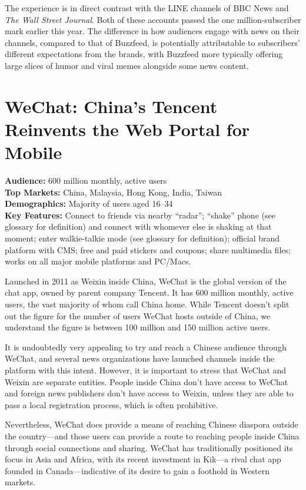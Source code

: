 \documentclass[notoc, symmetric, nobib, nols]{towcenter-guideto-book}
\begin{document}
The experience is in direct contrast with the LINE channels of BBC News and \textit{The Wall Street Journal}. Both of these accounts passed the one million-subscriber mark earlier this year. The difference in how audiences engage with news on their channels, compared to that of Buzzfeed, is potentially attributable to subscribers' different expectations from the brands, with Buzzfeed more typically offering large slices of humor and viral memes alongside some news content.

\section{WeChat: China's Tencent Reinvents the Web Portal for Mobile}

\begin{framed}
\noindent\textbf{Audience:} 600 million monthly, active users\\
\noindent\textbf{Top Markets:} China, Malaysia, Hong Kong, India, Taiwan\\
\noindent\textbf{Demographics:} Majority of users aged 16--34\\
\noindent\textbf{Key Features:} Connect to friends via nearby ``radar''; ``shake'' phone (see glossary for definition) and connect with whomever else is shaking at that moment; enter walkie-talkie mode (see glossary for definition); official brand platform with CMS; free and paid stickers and coupons; share multimedia files; works on all major mobile platforms and PC/Macs.
\end{framed}
\vspace{\baselineskip}
Launched in 2011 as Weixin inside China, WeChat is the global version of the chat app, owned by parent company Tencent. It has 600 million monthly, active users,\autocite{TencentResults} the vast majority of whom call China home. While Tencent doesn't split out the figure for the number of users WeChat hosts outside of China, we understand the figure is between 100 million and 150 million active users.

It is undoubtedly very appealing to try and reach a Chinese audience through WeChat, and several news organizations have launched channels inside the platform with this intent. However, it is important to stress that WeChat and Weixin are separate entities. People inside China don't have access to WeChat and foreign news publishers don't have access to Weixin, unless they are able to pass a local registration process, which is often prohibitive.

Nevertheless, WeChat does provide a means of reaching Chinese diaspora outside the country---and those users can provide a route to reaching people inside China through social connections and sharing. WeChat has traditionally positioned its focus in Asia and Africa, with its recent investment in Kik---a rival chat app founded in Canada---indicative of its desire to gain a foothold in Western markets.
\end{document}
